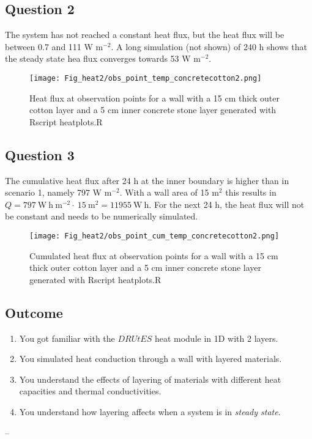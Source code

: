 \subsection*{Question 2}

The system has not reached a constant heat flux, but the heat flux will be between 0.7 and 111 W m$^{-2}$. A long simulation (not shown) of 240 h shows that the steady state hea flux converges towards 53 W m$^{-2}$.

\begin{figure}[!h]
\centering
\texttt{[image: Fig\_heat2/obs\_point\_temp\_concretecotton2.png]}
\caption{\label{plot5h2} Heat flux at observation points for a wall with a 15 cm thick outer cotton layer and a 5 cm inner concrete stone layer generated with Rscript heatplots.R}
\end{figure}


\subsection*{Question 3}

The cumulative heat flux after 24 h at the inner boundary is higher than in scenario 1, namely 797 W m$^{-2}$. With a wall area of 15 m$^2$ this results in $Q = 797~\mathrm{W~h~m^{-2}}\cdot~15~\mathrm{m^{2}}= 11955 ~\mathrm{W~h}$. 
For the next 24 h, the heat flux will not be constant and needs to be numerically simulated. 

\begin{figure}[!h]
\centering
\texttt{[image: Fig\_heat2/obs\_point\_cum\_temp\_concretecotton2.png]}
\caption{\label{plot6h2} Cumulated heat flux at observation points for a wall with a 15 cm thick outer cotton layer and a 5 cm inner concrete stone layer generated with Rscript heatplots.R}
\end{figure}

\newpage
\newpage
\newpage

\subsection{Outcome}
\begin{enumerate}
\item You got familiar with the $DRUtES$ heat module in 1D with 2 layers.
\item You simulated heat conduction through a wall with layered materials.
\item You understand the effects of layering of materials with different heat capacities and thermal conductivities.
\item You understand how layering affects when a system is in \emph{steady state}.
\end{enumerate}
--
